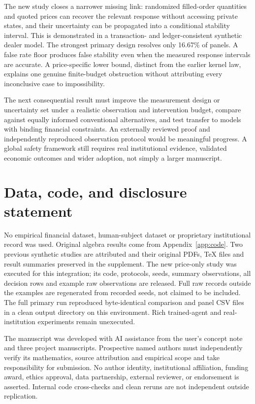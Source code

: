 \documentclass[11pt,a4paper]{article}
\theoremstyle{definition}
\theoremstyle{remark}
\begin{document}
The new study closes a narrower missing link: randomized filled-order quantities and quoted prices can recover the relevant response without accessing private states, and their uncertainty can be propagated into a conditional stability interval. This is demonstrated in a transaction- and ledger-consistent synthetic dealer model. The strongest primary design resolves only 16.67\% of panels. A false rate floor produces false stability even when the measured response intervals are accurate. A price-specific lower bound, distinct from the earlier kernel law, explains one genuine finite-budget obstruction without attributing every inconclusive case to impossibility.

The next consequential result must improve the measurement design or uncertainty set under a realistic observation and intervention budget, compare against equally informed conventional alternatives, and test transfer to models with binding financial constraints. An externally reviewed proof and independently reproduced observation protocol would be meaningful progress. A global safety framework still requires real institutional evidence, validated economic outcomes and wider adoption, not simply a larger manuscript.

\section*{Data, code, and disclosure statement}
No empirical financial dataset, human-subject dataset or proprietary institutional record was used. Original algebra results come from Appendix~\ref{app:code}. Two previous synthetic studies are attributed and their original PDFs, TeX files and result summaries preserved in the supplement. The new price-only study was executed for this integration; its code, protocols, seeds, summary observations, all decision rows and example raw observations are released. Full raw records outside the examples are regenerated from recorded seeds, not claimed to be included. The full primary run reproduced byte-identical comparison and panel CSV files in a clean output directory on this environment. Rich trained-agent and real-institution experiments remain unexecuted.

The manuscript was developed with AI assistance from the user's concept note and three project manuscripts. Prospective named authors must independently verify its mathematics, source attribution and empirical scope and take responsibility for submission. No author identity, institutional affiliation, funding award, ethics approval, data partnership, external reviewer, or endorsement is asserted. Internal code cross-checks and clean reruns are not independent outside replication.
\end{document}
